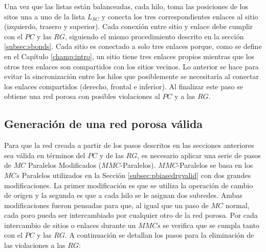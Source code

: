 Una vez que las listas están balanceadas, cada hilo, toma las posiciones de los sitos una a uno de la lista $L_{SC}$ y conecta los 
tres correspondientes enlaces al sitio (izquierdo, trasero y superior). Cada conexión entre sitio y enlace debe cumplir con 
el $PC$ y las $RG$, siguiendo el mismo procedimiento descrito en la sección \ref{subsec:sbonds}. Cada sitio es conectado a 
solo tres enlaces porque, como se define en el Capítulo \ref{champ:intro}, un sitio tiene tres enlaces propios mientras que 
los otros tres enlaces son compartidos con los sitios vecinos. Lo anterior se hace para evitar la sincronización entre los 
hilos que posiblemente se necesitaría al conectar los enlaces compartidos (derecho, frontal e inferior). Al finalizar este 
paso se obtiene una red porosa con posibles violaciones al $PC$ y a las $RG$.

\subsection{Generación de una red porosa válida}
\label{subsec:pvalid}
Para que la red creada a partir de los pasos descritos en las secciones anteriores sea válida en términos del $PC$ y de 
las $RG$, es necesario aplicar una serie de pasos de $MC$ Paralelos Modificados ($MMC$-Paralelos). $MMC$-Paralelos se basa
 en los $MCs$ Paralelos utilizados en la Secci\'on \ref{subsec:pbiasedrgvalid} 
con dos grandes modificaciones. La primer modificación es que se utiliza la operación de cambio de origen y la segunda es que a cada hilo 
se le asignan dos subredes. Ambas modificaciones fueron pensadas para que, al igual que un paso de $MC$ normal, cada poro pueda 
ser intercambiado por cualquier otro de la red porosa. Por cada intercambio de sitios o enlaces durante un $MMCs$ se verifica 
que se cumpla tanto con el $PC$ y las $RG$. A continuación se detallan los pasos para la eliminación de las violaciones a las $RG$:

